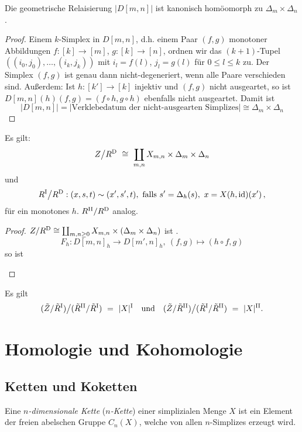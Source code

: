 \begin{lemma}
  \label{lemma:11}
  Die geometrische Relaisierung $|D[m,n]|$ ist kanonisch homöomorph zu
  $\Delta_m\times \Delta_n$.
\end{lemma}
\begin{proof}
  Einem $k$-Simplex in $D[m,n]$, d.h. einem Paar $(f,g)$ monotoner
  Abbildungen $f:[k]\to[m]$, $g:[k]\to [n]$, ordnen wir das $(k+1)$-Tupel
  $((i_0,j_0),\ldots,(i_k,j_k))$ mit $i_l = f(l)$, $j_l=g(l)$ für 
  $0\leq l\leq k$ zu. Der Simplex $(f,g)$ ist genau dann nicht-degeneriert,
  wenn alle Paare verschieden sind. Außerdem: Ist $h:[k']\to[k]$ injektiv und
  $(f,g)$ nicht ausgeartet, so ist $D[m,n](h)(f,g) = (f\circ h, g\circ h)$
  ebenfalls nicht ausgeartet. Damit ist
  \[|D[m,n]| = |\text{Verklebedatum der nicht-ausgearten Simplizes}|
    \cong \Delta_m\times\Delta_n\]
\end{proof}


\begin{folgerung}
  Es gilt: 
  \[ Z\big/ R^\mathrm{D} \ \cong\  \coprod_{m,n} X_{m,n}\times \Delta_m 
    \times \Delta_n\]
  und
  \[ R^\mathrm{I} \big/R^\mathrm{D}: (x,s,t) \sim(x',s',t),
    \text{ falls } s'=\Delta_h(s),\ x = X(h,\operatorname{id})(x')\,,\]
  für ein monotones $h$. $R^\mathrm{II}/R^\mathrm{D}$ analog.
\end{folgerung}
\begin{proof}
  $Z/R^\mathrm{D} \cong\coprod_{m,n\geq 0} X_{m,n} \times (\Delta_m\times \Delta_n)$
  ist .
  \[ F_h: D[m,n]_h \to D[m',n]_h,\ (f,g) \mapsto (h\circ f, g)\]
  so ist 
  \begin{center}
  \end{center}
\end{proof}



\begin{folgerung}
  Es gilt
  \[ (\tilde Z / \tilde R^\mathrm{I})\big/ (\tilde R^\mathrm{II}/\tilde R^\mathrm{I}) 
    \ =\  |X|^\mathrm{I} \quad\text{und}\quad
    (\tilde Z/\tilde R^\mathrm{II}) \big/ (\tilde R^\mathrm{I} / \tilde R^\mathrm{II}) 
    \ =\  |X|^\mathrm{II}.\]
\end{folgerung}


\section{Homologie und Kohomologie}

\subsection{Ketten und Koketten}

\begin{definition}
  Eine \emph{$n$-dimensionale Kette} (\emph{$n$-Kette}) einer simplizialen
  Menge $X$ ist ein Element der freien abelschen Gruppe $C_n(X)$, welche von
  allen $n$-Simplizes erzeugt wird.
\end{definition}

